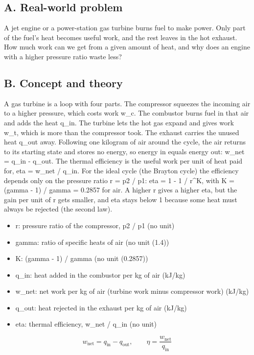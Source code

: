 \documentclass[11pt,a4paper]{article}
\begin{document}
\subsection*{A. Real-world problem}
A jet engine or a power-station gas turbine burns fuel to make power. Only part of the fuel's heat becomes useful work, and the rest leaves in the hot exhaust. How much work can we get from a given amount of heat, and why does an engine with a higher pressure ratio waste less?

\subsection*{B. Concept and theory}
A gas turbine is a loop with four parts. The compressor squeezes the incoming air to a higher pressure, which costs work w\_c. The combustor burns fuel in that air and adds the heat q\_in. The turbine lets the hot gas expand and gives work w\_t, which is more than the compressor took. The exhaust carries the unused heat q\_out away. Following one kilogram of air around the cycle, the air returns to its starting state and stores no energy, so energy in equals energy out: w\_net = q\_in - q\_out. The thermal efficiency is the useful work per unit of heat paid for, eta = w\_net / q\_in. For the ideal cycle (the Brayton cycle) the efficiency depends only on the pressure ratio r = p2 / p1: eta = 1 - 1 / r\textasciicircum{}K, with K = (gamma - 1) / gamma = 0.2857 for air. A higher r gives a higher eta, but the gain per unit of r gets smaller, and eta stays below 1 because some heat must always be rejected (the second law).

\begin{itemize}[nosep]
\item r: pressure ratio of the compressor, p2 / p1 (no unit)
\item gamma: ratio of specific heats of air (no unit (1.4))
\item K: (gamma - 1) / gamma (no unit (0.2857))
\item q\_in: heat added in the combustor per kg of air (kJ/kg)
\item w\_net: net work per kg of air (turbine work minus compressor work) (kJ/kg)
\item q\_out: heat rejected in the exhaust per kg of air (kJ/kg)
\item eta: thermal efficiency, w\_net / q\_in (no unit)
\end{itemize}

\[ w_{\mathrm{net}} = q_{\mathrm{in}} - q_{\mathrm{out}},\qquad \eta = \frac{w_{\mathrm{net}}}{q_{\mathrm{in}}} \]
\end{document}
